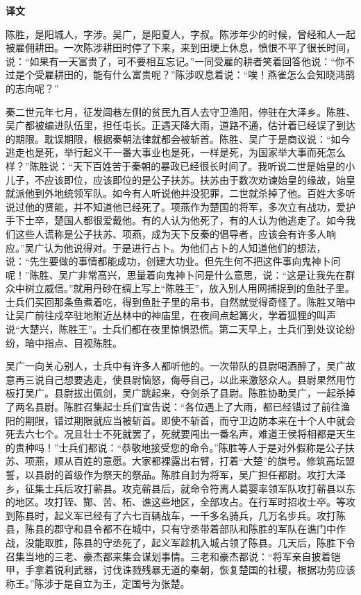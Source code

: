 \documentclass[12pt,UTF-8,openany,a4]{ctexbook}
\begin{document}
\newpage

\begin{Large}
    \noindent\textbf{译文}
\end{Large}


\vspace{1em}

\begin{large}
    \yiwen 
    陈胜，是阳城人，字涉。吴广，是阳夏人，字叔。陈涉年少的时候，曾经和人一起被雇佣耕田。一次陈涉耕田时停了下来，来到田埂上休息，愤恨不平了很长时间，说：“如果有一天富贵了，可不要相互忘记。”一同受雇的耕者笑着回答他说：“你不过是个受雇耕田的，能有什么富贵呢？”陈涉叹息着说：“唉！燕雀怎么会知晓鸿鹄的志向呢？”
    
    秦二世元年七月，征发闾巷左侧的贫民九百人去守卫渔阳，停驻在大泽乡。陈胜、吴广都被编进队伍里，担任屯长。正遇天降大雨，道路不通，估计着已经误了到达的期限。耽误期限，根据秦朝法律就都会被斩首。陈胜、吴广于是商议说：“如今逃走也是死，举行起义干一番大事业也是死，一样是死，为国家举大事而死怎么样？”陈胜说：“天下百姓苦于秦朝的暴政已经很长时间了。我听说二世是始皇的小儿子，不应该即位，应该即位的是公子扶苏。扶苏由于数次劝谏始皇的缘故，始皇就派他到外地统领军队。如今有人听说他并没犯罪，二世就杀掉了他。百姓大多听说过他的贤能，并不知道他已经死了。项燕作为楚国的将军，多次立有战功，爱护手下士卒，楚国人都很爱戴他。有的人认为他死了，有的人认为他逃走了。如今我们这些人谎称是公子扶苏、项燕，成为天下反秦的倡导者，应该会有许多人响应。”吴广认为他说得对。于是进行占卜。为他们占卜的人知道他们的想法，说：“先生要做的事情都能成功，创建大功业。但先生何不把这件事向鬼神卜问呢！”陈胜、吴广非常高兴，思量着向鬼神卜问是什么意思，说：“这是让我先在群众中树立威信。”就用丹砂在绸上写上“陈胜王”，放入别人用网捕捉到的鱼肚子里。士兵们买回那条鱼煮着吃，得到鱼肚子里的帛书，自然就觉得奇怪了。陈胜又暗中让吴广前往戍卒驻地附近丛林中的神庙里，在夜间点起篝火，学着狐狸的叫声说“大楚兴，陈胜王”。士兵们都在夜里惊惧恐慌。第二天早上，士兵们到处议论纷纷，暗中指点、目视陈胜。
    
    吴广一向关心别人，士兵中有许多人都听他的。一次带队的县尉喝酒醉了，吴广故意再三说自己想要逃走，使县尉恼怒，侮辱自己，以此来激怒众人。县尉果然用竹板打吴广。县尉拔出佩剑，吴广跳起来，夺剑杀了县尉。陈胜协助吴广，一起杀掉了两名县尉。陈胜召集起士兵们宣告说：“各位遇上了大雨，都已经错过了前往渔阳的期限，错过期限就应当被斩首。即使不斩首，而守卫边防本来在十个人中就会死去六七个。况且壮士不死就罢了，死就要闯出一番名声，难道王侯将相都是天生的贵种吗！”士兵们都说：“恭敬地接受您的命令。”陈胜等人于是对外假称是公子扶苏、项燕，顺从百姓的意愿。大家都裸露出右臂，打着“大楚”的旗号。修筑高坛盟誓，以县尉的首级作为祭天的祭品。陈胜自封为将军，吴广担任都尉。攻打大泽乡，征集士兵后攻打蕲县。攻克蕲县后，就命令符离人葛婴率领军队攻打蕲县以东的地区。攻打铚、酂、苦、柘、谯这些地区，全部攻占。在行军时招收士卒。等攻到陈县时，起义军已经有了六七百辆战车，一千多名骑兵，几万名步兵。攻打陈县，陈县的郡守和县令都不在城中，只有守丞带着部队和陈胜的军队在谯门中作战，没能取胜，陈县的守丞死了，起义军趁机入城占领了陈县。几天后，陈胜下令召集当地的三老、豪杰都来集会谋划事情。三老和豪杰都说：“将军亲自披着铠甲，手拿着锐利武器，讨伐诛戮残暴无道的秦朝，恢复楚国的社稷，根据功劳应该称王。”陈涉于是自立为王，定国号为张楚。
    

\end{large}
\end{document}

